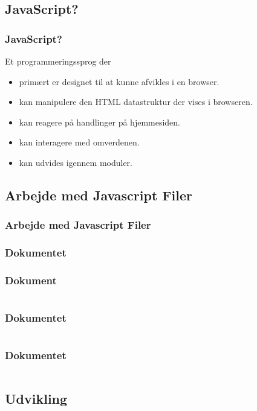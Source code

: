\subsection{JavaScript?}
\begin{frame}
    \frametitle{JavaScript?}
    Et programmeringssprog der
    \begin{itemize}
      \item primært er designet til at kunne afvikles i en browser.
      \item kan manipulere den HTML datastruktur der vises i browseren.
      \item kan reagere på handlinger på hjemmesiden.
      \item kan interagere med omverdenen.
      \item kan udvides igennem moduler.
    \end{itemize}
\end{frame}

\subsection{Arbejde med Javascript Filer}
\begin{frame}
    \frametitle{Arbejde med Javascript Filer}
    \vspace{7mm}
    \begin{center}
    \end{center}
\end{frame}

\subsubsection{Dokumentet}

\begin{frame}
    \frametitle{Dokument}
    \inputminted{html}{../src/frontend/part2_hello/index.html}
\end{frame}

\begin{frame}
    \frametitle{Dokumentet}
    \inputminted[highlightlines={11}]{html}{../src/frontend/part2_hello/index.html}
\end{frame}

\begin{frame}
    \frametitle{Dokumentet}
    \inputminted[highlightlines={9}]{html}{../src/frontend/part2_hello/index.html}
\end{frame}

\subsection{Udvikling}

